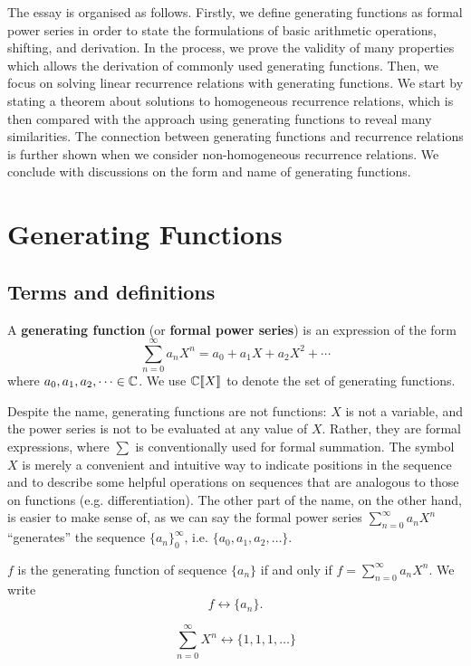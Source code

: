 \documentclass[a4paper, 12pt]{report}
\begin{document}
The essay is organised as follows. Firstly, we define generating functions as formal power series in order to state the formulations of basic arithmetic operations, shifting, and derivation. In the process, we prove the validity of many properties which allows the derivation of commonly used generating functions. Then, we focus on solving linear recurrence relations with generating functions. We start by stating a theorem about solutions to homogeneous recurrence relations, which is then compared with the approach using generating functions to reveal many similarities. The connection between generating functions and recurrence relations is further shown when we consider non-homogeneous recurrence relations. We conclude with discussions on the form and name of generating functions.

\chapter{Generating Functions}\label{ch:gf}
\section{Terms and definitions}
\begin{defn}\label{def:gf-def}
A \textbf{generating function} (or \textbf{formal power series}) is an expression of the form 
\[\sum_{n = 0}^{\infty} a_n X^n = a_0 + a_1 X + a_2 X^2 + \cdots\]
where $a_0, a_1, a_2, \dots \in \mathbb{C}$. We use $\mathbb{C}\llbracket X \rrbracket$ to denote the set of generating functions.
\end{defn}

Despite the name, generating functions are not functions: $X$ is not a variable, and the power series is not to be evaluated at any value of $X$. Rather, they are formal expressions, where $\sum$ is conventionally used for formal summation. The symbol $X$ is merely a convenient and intuitive way to indicate positions in the sequence and to describe some helpful operations on sequences that are analogous to those on functions (e.g. differentiation). The other part of the name, on the other hand, is easier to make sense of, as we can say the formal power series $\sum_{n = 0}^{\infty} a_n X^n$ ``generates'' the sequence $\{a_n\}_0^\infty$, i.e. $\{a_0, a_1, a_2, \dots\}$.

\begin{defn}\label{def:gf-seq}
 $f$ is the generating function of sequence $\{a_n\}$ if and only if $f = \sum_{n = 0}^{\infty} a_n X^n$. We write 
 \[f \longleftrightarrow \{a_n\}.\]
\end{defn}
\begin{ex*}\label{ex:gf-111}
$$\sum_{n = 0}^\infty X^n \longleftrightarrow \{1, 1, 1, \dots\}$$
\end{ex*}
\end{document}
